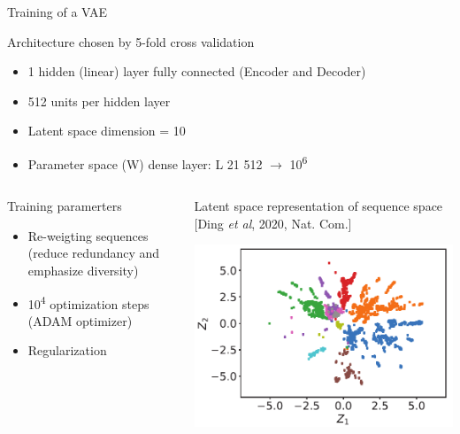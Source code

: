 \documentclass[presentation,smaller]{beamer}
\begin{document}
\begin{frame}[label={sec:org5d88413}]{Training of a VAE}
\begin{block}{Architecture chosen by 5-fold cross validation}
\begin{itemize}
\item 1 \texttimes{} hidden (linear) layer fully connected (Encoder and Decoder)
\item 512 units per hidden layer
\item Latent space dimension = 10
\item Parameter space (W) dense layer: L \texttimes{} 21 \texttimes{} 512 \(\rightarrow\) 10\textsuperscript{6}
\end{itemize}
\end{block}
\begin{columns}
\begin{column}{0.5\columnwidth}
\begin{block}{Training paramerters}
\begin{itemize}
\item Re-weigting sequences (reduce redundancy and emphasize diversity)
\item 10\textsuperscript{4} optimization steps (ADAM optimizer)
\item Regularization
\end{itemize}
\end{block}
\end{column}

\begin{column}{0.5\columnwidth}
\begin{block}{Latent space representation of sequence space}
[Ding \emph{et al}, 2020, Nat. Com.]
\begin{center}
\includegraphics[width=.9\linewidth]{img/proj_prot_ding.png}
\end{center}
\end{block}
\end{column}
\end{columns}
\end{frame}
\end{document}
